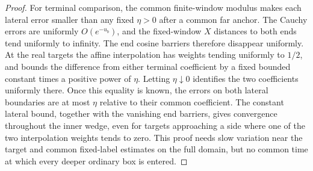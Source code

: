\begin{proof}
For terminal comparison, the common finite-window modulus
makes each lateral error smaller than any fixed $\eta>0$
after a common far anchor.  The Cauchy errors are uniformly
$O(e^{-u_b})$, and the fixed-window $X$ distances to both
ends tend uniformly to infinity.  The end cosine barriers
therefore disappear uniformly.  At the real targets the
affine interpolation has weights tending uniformly to $1/2$,
and bounds the difference from either terminal coefficient by
a fixed bounded constant times a positive power of $\eta$.
Letting $\eta\downarrow0$ identifies the two coefficients
uniformly there.  Once this equality is known, the errors on
both lateral boundaries are at most $\eta$ relative to their
common coefficient.  The constant lateral bound, together
with the vanishing end barriers, gives convergence throughout
the inner wedge, even for targets approaching a side where
one of the two interpolation weights tends to zero.
This proof needs slow variation near the target and
common fixed-label estimates on the full domain, but no common
time at which every deeper ordinary box is entered.
\end{proof}
